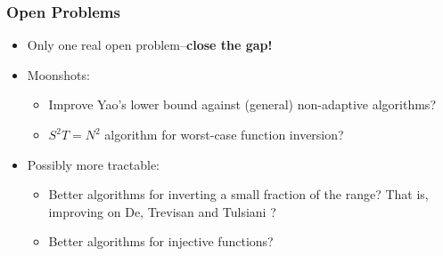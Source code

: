 \documentclass[usenames, dvipsnames, t, table]{beamer}
\begin{document}
      \begin{frame}
        \frametitle{Open Problems}
        \begin{itemize}
        \item Only one real open problem--\pause\textbf{close the gap!}
          \pause
        \item Moonshots:
        \begin{itemize}
         \item Improve Yao's lower bound against (general) non-adaptive algorithms?
          \pause
        \item $S^2 T = N^2$ algorithm for worst-case function inversion?
          \pause
        \end{itemize}
        \item Possibly more tractable:
\begin{itemize}
        \item Better algorithms for inverting a small fraction of the range? That is, improving on De, Trevisan and Tulsiani \cite{DTT10}?
          \pause
        \item Better algorithms for injective functions?
\end{itemize}
        \end{itemize}
      \end{frame}
\end{document}
